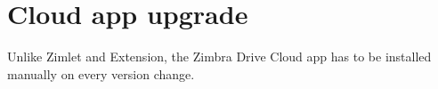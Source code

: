 \section{Cloud app upgrade}
Unlike Zimlet and Extension, the Zimbra Drive Cloud app has to be installed manually on every version change.
